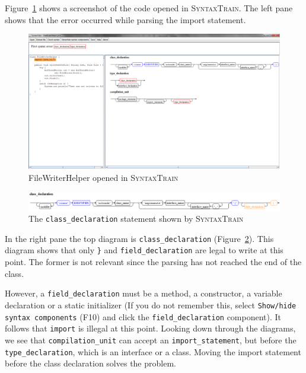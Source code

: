 \documentclass[11pt]{article}
\newcommand*{\st}{\textsc{SyntaxTrain}}
\begin{document}
Figure~\ref{fileWriterHelperScreenshot} shows a screenshot of the code
opened in \st{}. The left pane shows that the error occurred while
parsing the import statement.

\begin{figure}[htbp]
\begin{center}
\includegraphics[width=.8\textwidth,keepaspectratio=fixed]{fileWriter.png}
\end{center}
\caption{FileWriterHelper opened in \st{}}\label{fileWriterHelperScreenshot}
\end{figure}

\begin{figure}[htbp]
\begin{center}
\includegraphics[width=\textwidth,keepaspectratio=fixed]{fileWriterClassDeclaration.png}
\end{center}
\caption{The \texttt{class\_declaration} statement shown by \st{}}\label{fileWriterClassDeclaration}
\end{figure}

In the right pane the top diagram is \texttt{class\_declaration}
(Figure~\ref{fileWriterClassDeclaration}). This diagram shows that only
\verb+}+ and \texttt{field\_declaration} are legal to write at this
point. The former is not relevant since the parsing has not reached the
end of the class.

However, a \texttt{field\_declaration} must be a method, a constructor,
a variable declaration or a static initializer (If you do not remember
this, select \texttt{Show/hide syntax components} (F10) and click the
\texttt{field\_declaration} component). It follows that \texttt{import}
is illegal at this point. Looking down through the diagrams, we see that
\texttt{compilation\_unit} can accept an \texttt{import\_statement}, but
before the \texttt{type\_declaration}, which is an interface or a class.
Moving the import statement before the class declaration solves the
problem.
\end{document}
